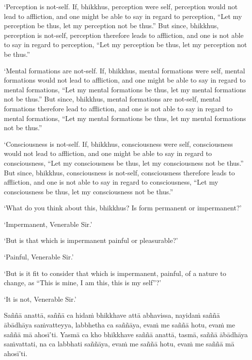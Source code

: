 \clearpage

\englishText
\markboth{\englishTitle}{\rightmark}

‘Perception is not-self. If, bhikkhus, perception were self, perception
would not lead to affliction, and one might be able to say in regard to
perception, “Let my perception be thus, let my perception not be thus.”
But since, bhikkhus, perception is not-self, perception therefore leads
to affliction, and one is not able to say in regard to perception, “Let
my perception be thus, let my perception not be thus.”

‘Mental formations are not-self. If, bhikkhus, mental formations were
self, mental formations would not lead to affliction, and one might be
able to say in regard to mental formations, “Let my mental formations be
thus, let my mental formations not be thus.” But since, bhikkhus, mental
formations are not-self, mental formations therefore lead to affliction,
and one is not able to say in regard to mental formations, “Let my
mental formations be thus, let my mental formations not be thus.”

‘Consciousness is not-self. If, bhikkhus, consciousness were self,
consciousness would not lead to affliction, and one might be able to say
in regard to consciousness, “Let my consciousness be thus, let my
consciousness not be thus.” But since, bhikkhus, consciousness is
not-self, consciousness therefore leads to affliction, and one is not
able to say in regard to consciousness, “Let my consciousness be thus,
let my consciousness not be thus.”

‘What do you think about this, bhikkhus? Is form permanent or
impermanent?’

‘Impermanent, Venerable Sir.’

‘But is that which is impermanent painful or pleasurable?’

‘Painful, Venerable Sir.’

‘But is it fit to consider that which is impermanent, painful, of a
nature to change, as “This is mine, I am this, this is my self”?’

‘It is not, Venerable Sir.’

\clearpage

\paliText
\markboth{\paliTitle}{\rightmark}

Saññā anattā, saññā ca hidaṁ bhikkhave attā abhavissa, nayidaṁ saññā ābādhāya
saṁvatteyya, labbhetha ca saññāya, evaṁ me saññā hotu, evaṁ me saññā mā
ahosī'ti. Yasmā ca kho bhikkhave saññā anattā, tasmā, saññā ābādhāya saṁvattati,
na ca labbhati saññāya, evaṁ me saññā hotu, evaṁ me saññā mā ahosī'ti.

